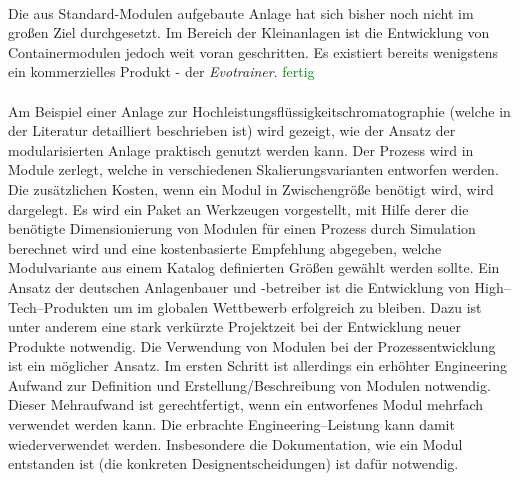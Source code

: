 \paragraph*{\cite{Lang_2012}} Die aus Standard-Modulen aufgebaute Anlage hat sich bisher noch nicht im gro\ss{}en Ziel durchgesetzt. Im Bereich der Kleinanlagen ist die Entwicklung von Containermodulen jedoch weit voran geschritten. Es existiert bereits wenigstens ein kommerzielles Produkt - der \textit{Evotrainer}. \textcolor{green}{fertig}

\paragraph*{\cite{Rottke_2012}} Am Beispiel einer Anlage zur Hochleistungsfl\"ussigkeitschromatographie (welche in der Literatur detailliert beschrieben ist) wird gezeigt, wie der Ansatz der modularisierten Anlage praktisch genutzt werden kann. Der Prozess wird in Module zerlegt, welche in verschiedenen Skalierungsvarianten entworfen werden. Die zus\"atzlichen Kosten, wenn ein Modul in Zwischengr\"o\ss{}e ben\"otigt wird, wird dargelegt. Es wird ein Paket an Werkzeugen vorgestellt, mit Hilfe derer die ben\"otigte Dimensionierung von Modulen f\"ur einen Prozess durch Simulation berechnet wird und eine kostenbasierte Empfehlung abgegeben, welche Modulvariante aus einem Katalog definierten Gr\"o\ss{}en gew\"ahlt werden sollte. \hfill \newline
Ein Ansatz der deutschen Anlagenbauer und -betreiber ist die Entwicklung von High--Tech--Produkten um im globalen Wettbewerb erfolgreich zu bleiben. Dazu ist unter anderem eine stark verk\"urzte Projektzeit bei der Entwicklung neuer Produkte notwendig. Die Verwendung von Modulen bei der Prozessentwicklung ist ein m\"oglicher Ansatz. Im ersten Schritt ist allerdings ein erh\"ohter Engineering Aufwand zur Definition und Erstellung/Beschreibung von Modulen notwendig. Dieser Mehraufwand ist gerechtfertigt, wenn ein entworfenes Modul mehrfach verwendet werden kann. Die erbrachte Engineering--Leistung kann damit wiederverwendet werden. Insbesondere die Dokumentation, wie ein Modul entstanden ist (die konkreten Designentscheidungen) ist daf\"ur notwendig.  \hfill \newline
